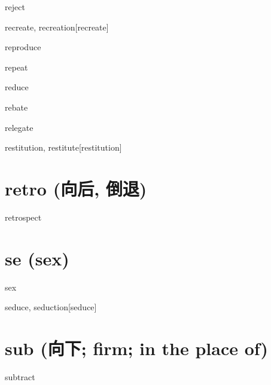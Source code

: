 \begin{RefWord}{reject}
\end{RefWord}

\begin{RefWord}{recreate, recreation}[recreate]
\end{RefWord}

\begin{RefWord}{reproduce}
\end{RefWord}

\begin{RefWord}{repeat}
\end{RefWord}

\begin{RefWord}{reduce}
\end{RefWord}

\begin{RefWord}{rebate}
\end{RefWord}

\begin{RefWord}{relegate}
\end{RefWord}

\begin{RefWord}{restitution, restitute}[restitution]
\end{RefWord}

\section{retro (向后, 倒退)}
\begin{RefWord}{retrospect}
\end{RefWord}

\section{se (sex)}

\begin{RefWord}{sex}
\end{RefWord}

\begin{RefWord}{seduce, seduction}[seduce]
\end{RefWord}


\section{sub (向下; firm; in the place of)}

\begin{RefWord}{subtract}
\end{RefWord}


